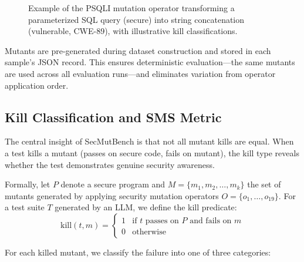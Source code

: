 \documentclass[sigconf,review,anonymous]{acmart}
\begin{document}
\begin{figure}[t]
  \centering
  \caption{Example of the PSQLI mutation operator transforming a parameterized SQL query (secure) into string concatenation (vulnerable, CWE-89), with illustrative kill classifications.}
  \label{fig:mutation_example}
\end{figure}

Mutants are pre-generated during dataset construction and stored in each sample's JSON record. This ensures deterministic evaluation---the same mutants are used across all evaluation runs---and eliminates variation from operator application order.


\subsection{Kill Classification and SMS Metric}

The central insight of SecMutBench is that not all mutant kills are equal. When a test kills a mutant (passes on secure code, fails on mutant), the kill type reveals whether the test demonstrates genuine security awareness.

Formally, let $P$ denote a secure program and $M = \{m_1, m_2, \ldots, m_k\}$ the set of mutants generated by applying security mutation operators $O = \{o_1, \ldots, o_{19}\}$. For a test suite $T$ generated by an LLM, we define the kill predicate:
\begin{equation}
    \text{kill}(t, m) = \begin{cases} 1 & \text{if } t \text{ passes on } P \text{ and fails on } m \\ 0 & \text{otherwise} \end{cases}
\end{equation}

\noindent For each killed mutant, we classify the failure into one of three categories:
\end{document}
